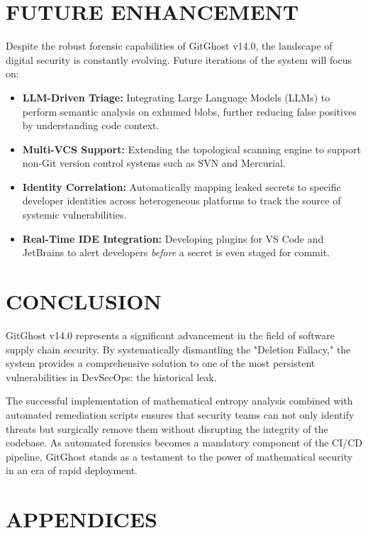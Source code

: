 \documentclass[12pt, a4paper, oneside]{report}
\begin{document}
\chapter{FUTURE ENHANCEMENT}
Despite the robust forensic capabilities of GitGhost v14.0, the landscape of digital security is constantly evolving. Future iterations of the system will focus on:
\begin{itemize}
    \item \textbf{LLM-Driven Triage:} Integrating Large Language Models (LLMs) to perform semantic analysis on exhumed blobs, further reducing false positives by understanding code context.
    \item \textbf{Multi-VCS Support:} Extending the topological scanning engine to support non-Git version control systems such as SVN and Mercurial.
    \item \textbf{Identity Correlation:} Automatically mapping leaked secrets to specific developer identities across heterogeneous platforms to track the source of systemic vulnerabilities.
    \item \textbf{Real-Time IDE Integration:} Developing plugins for VS Code and JetBrains to alert developers \textit{before} a secret is even staged for commit.
\end{itemize}

\chapter{CONCLUSION}
GitGhost v14.0 represents a significant advancement in the field of software supply chain security. By systematically dismantling the "Deletion Fallacy," the system provides a comprehensive solution to one of the most persistent vulnerabilities in DevSecOps: the historical leak. 

The successful implementation of mathematical entropy analysis combined with automated remediation scripts ensures that security teams can not only identify threats but surgically remove them without disrupting the integrity of the codebase. As automated forensics becomes a mandatory component of the CI/CD pipeline, GitGhost stands as a testament to the power of mathematical security in an era of rapid deployment.

\chapter{APPENDICES}
\end{document}
